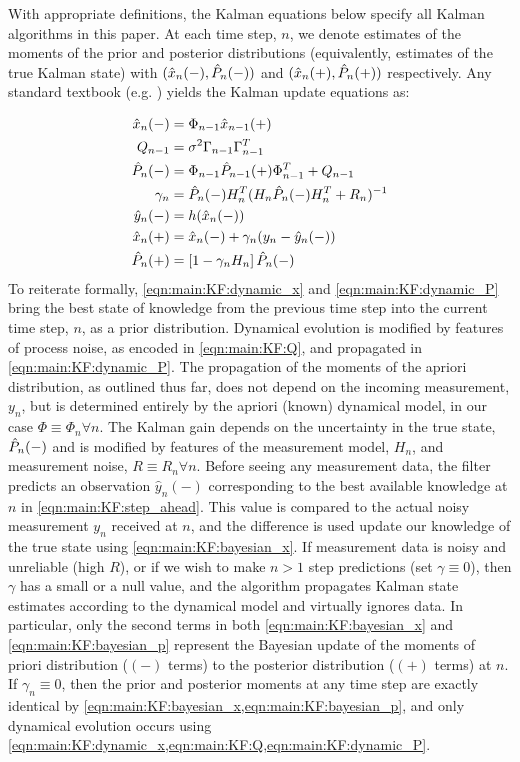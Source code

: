 \documentclass[pra, reprint]{revtex4-1}
\begin{document}
With appropriate definitions, the Kalman equations below specify all Kalman algorithms in this paper. At each time step, $n$,  we denote estimates of the moments of the  prior and posterior distributions (equivalently, estimates of the true Kalman state) with $(\hat{x}_{n}(-), \hat{P}_{n}(-))$ and $(\hat{x}_{n}(+), \hat{P}_{n}(+))$ respectively. Any standard textbook (e.g. \cite{grewal2001theory}) yields the Kalman update equations as:

\begin{align}
\hat{x}_{n}(-) & = \Phi_{n-1} \hat{x}_{n-1}(+) \label{eqn:main:KF:dynamic_x}\\ 
Q_{n-1} & = \sigma^2 \Gamma_{n-1}\Gamma_{n-1}^T  \label{eqn:main:KF:Q}\\
\hat{P}_{n}(-)&= \Phi_{n-1} \hat{P}_{n-1}(+) \Phi_{n-1}^T + Q_{n-1} \label{eqn:main:KF:dynamic_P}\\
\gamma_n &= \hat{P}_{n}(-) H_n^T(H_n\hat{P}_{n}(-)H_n^T + R_n)^{-1} \label{eqn:main:KF:gain}\\
\hat{y}_n(-) & = h(\hat{x}_{n}(-)) \label{eqn:main:KF:step_ahead}\\
\hat{x}_{n}(+) &= \hat{x}_{n}(-) + \gamma_n (y_n - \hat{y}_n(-)) \label{eqn:main:KF:bayesian_x}\\
\hat{P}_{n}(+) &= \left[1  - \gamma_n H_n \right] \hat{P}_{n}(-) \label{eqn:main:KF:bayesian_p}
\end{align}
To reiterate formally, \cref{eqn:main:KF:dynamic_x} and \cref{eqn:main:KF:dynamic_P} bring the best state of knowledge from the previous time step into the current time step, $n$, as a prior distribution. Dynamical evolution is modified by features of process noise, as encoded in \cref{eqn:main:KF:Q}, and propagated in \cref{eqn:main:KF:dynamic_P}. The propagation of the moments of the apriori distribution, as outlined thus far, does not depend on the incoming measurement, $y_n$, but is determined entirely by the apriori (known) dynamical model, in our case $\Phi \equiv \Phi_n \forall n$. The Kalman gain depends on the uncertainty in the true state, $\hat{P}_{n}(-)$ and is modified by features of the measurement model, $H_n$,  and measurement noise, $R\equiv R_n \forall n$. Before seeing any measurement data, the filter predicts an observation $\hat{y}_n(-)$ corresponding to the best available knowledge at $n$ in \cref{eqn:main:KF:step_ahead}. This value is compared to the actual noisy measurement $y_n$ received at $n$, and the difference is used update our knowledge of the true state using \cref{eqn:main:KF:bayesian_x}. If measurement data is noisy and unreliable (high $R$), or if we wish to make $n>1$ step predictions (set $\gamma \equiv 0$), then $\gamma$ has a small or a null value, and the algorithm propagates Kalman state estimates according to the dynamical model and virtually ignores data. In particular, only the second terms in both \cref{eqn:main:KF:bayesian_x} and \cref{eqn:main:KF:bayesian_p} represent the Bayesian update of the moments of priori distribution ($(-)$ terms) to the posterior distribution ($(+)$ terms) at $n$. If $\gamma_n \equiv 0$, then the prior and posterior moments at any time step are exactly identical by \cref{eqn:main:KF:bayesian_x,eqn:main:KF:bayesian_p}, and only dynamical evolution occurs using \cref{eqn:main:KF:dynamic_x,eqn:main:KF:Q,eqn:main:KF:dynamic_P}. 
\end{document}
